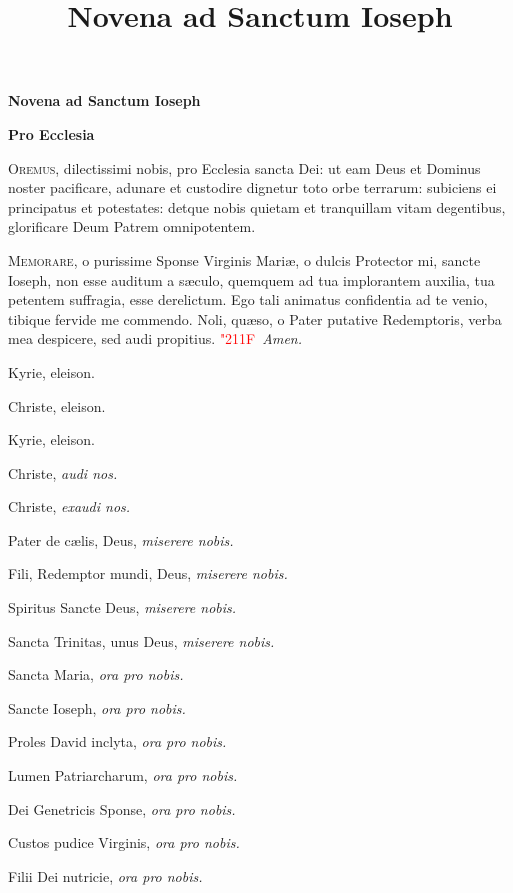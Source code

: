 \documentclass[12pt]{article}\errorcontextlines=9
\title{Novena ad Sanctum Ioseph}
\newcommand\centerheading[1]{%
\begin{center}
\normalsize\textbf{#1}\\%
\end{center}
}
\newcommand\response[1]{%
\textcolor{red}{\char"211F\ }#1%
}
\begin{document}
\centerheading{\LARGE{\color{red}Novena ad Sanctum Ioseph}}
\centerheading{{\color{red}Pro Ecclesia}}

\bigskip

\begin{multicols}{2}

\lettrine{O}{\color{red}remus}, dilectissimi nobis, pro Ecclesia sancta Dei: ut eam Deus et Dominus noster pacificare,
 adunare et custodire dignetur toto orbe terrarum: subiciens ei principatus et potestates: detque nobis quietam 
 et tranquillam vitam degentibus, glorificare Deum Patrem omnipotentem.

\bigskip

\lettrine{M}{\color{red}emorare}, o purissime Sponse Virginis Mari\ae , o dulcis Protector mi, sancte Ioseph, non esse auditum a 
s\ae culo, quemquem ad tua implorantem auxilia, tua petentem suffragia, esse derelictum. Ego tali animatus confidentia ad te venio, 
tibique fervide me commendo. Noli, qu\ae so, o Pater putative Redemptoris, verba mea despicere, sed audi propitius.
\response \textit{Amen.}

\bigskip

Kyrie, eleison.

Christe, eleison.

Kyrie, eleison.

Christe, \hfill \textit{audi nos.}

Christe, \hfill \textit{exaudi nos.}

Pater de c\ae lis, Deus, \hfill \textit{miserere nobis.}

Fili, Redemptor mundi, Deus, \hfill \textit{miserere nobis.}

Spiritus Sancte Deus, \hfill \textit{miserere nobis.}

Sancta Trinitas, unus Deus, \hfill \textit{miserere nobis.}

Sancta Maria, \hfill \textit{ora pro nobis.}

Sancte Ioseph, \hfill \textit{ora pro nobis.}

Proles David inclyta, \hfill \textit{ora pro nobis.}

Lumen Patriarcharum, \hfill \textit{ora pro nobis.}

Dei Genetricis Sponse, \hfill \textit{ora pro nobis.}

Custos pudice Virginis, \hfill \textit{ora pro nobis.}

Filii Dei nutricie, \hfill \textit{ora pro nobis.}


\end{multicols}
\end{document}
